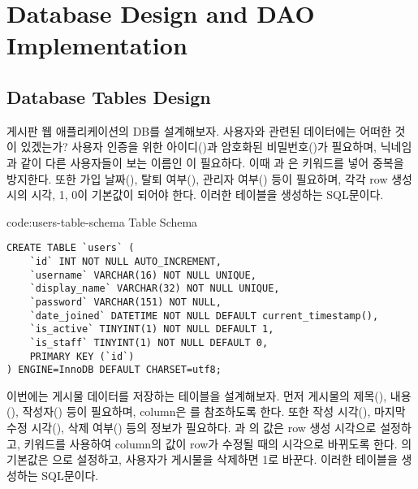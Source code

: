 \section{Database Design and DAO Implementation}\label{sect:db-design-and-dao-implementation}

\subsection*{Database Tables Design}

게시판 웹 애플리케이션의 DB를 설계해보자. 사용자와 관련된 데이터에는 어떠한 것이 있겠는가? 사용자 인증을 위한 아이디()과 암호화된 비밀번호()가 필요하며, 닉네임과 같이 다른 사용자들이 보는 이름인 이 필요하다. 이때 과 은  키워드를 넣어 중복을 방지한다. 또한 가입 날짜(), 탈퇴 여부(), 관리자 여부() 등이 필요하며, 각각 row 생성 시의 시각, 1, 0이 기본값이 되어야 한다. \는 이러한  테이블을 생성하는 SQL문이다.

\begin{codeenv}{code:users-table-schema}{ Table Schema}\begin{verbatim}
CREATE TABLE `users` (
    `id` INT NOT NULL AUTO_INCREMENT,
    `username` VARCHAR(16) NOT NULL UNIQUE,
    `display_name` VARCHAR(32) NOT NULL UNIQUE,
    `password` VARCHAR(151) NOT NULL,
    `date_joined` DATETIME NOT NULL DEFAULT current_timestamp(),
    `is_active` TINYINT(1) NOT NULL DEFAULT 1,
    `is_staff` TINYINT(1) NOT NULL DEFAULT 0,
    PRIMARY KEY (`id`)
) ENGINE=InnoDB DEFAULT CHARSET=utf8;
\end{verbatim}
\end{codeenv}

이번에는 게시물 데이터를 저장하는  테이블을 설계해보자. 먼저 게시물의 제목(), 내용(), 작성자() 등이 필요하며,  column은 를 참조하도록 한다. 또한 작성 시각(), 마지막 수정 시각(), 삭제 여부() 등의 정보가 필요하다. 과 의 값은 row 생성 시각으로 설정하고,  키워드를 사용하여 column의 값이 row가 수정될 때의 시각으로 바뀌도록 한다. 의 기본값은 으로 설정하고, 사용자가 게시물을 삭제하면 1로 바꾼다. \는 이러한  테이블을 생성하는 SQL문이다.

